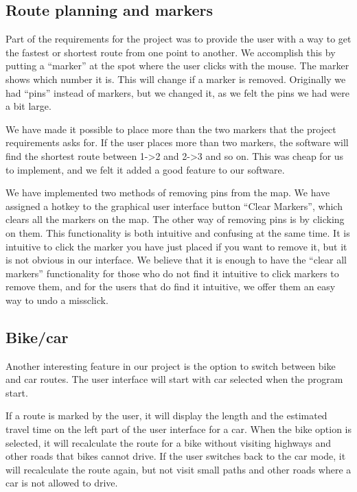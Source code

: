 \subsection{Route planning and markers}
\label{UIA-IF-M}
Part of the requirements for the project was to provide the user with a way to
get the fastest or shortest route from one point to another. We accomplish this
by putting a ``marker'' at the spot where the user clicks with the mouse. The
marker shows which number it is. This will change if a marker is removed.
Originally we had ``pins'' instead of markers, but we changed it, as we felt the
pins we had were a bit large.

We have made it possible to place more than the two markers that the project
requirements asks for. If the user places more than two markers, the software
will find the shortest route between 1->2 and 2->3 and so on. This was cheap for
us to implement, and we felt it added a good feature to our software. 

We have implemented two methods of removing pins from the map. We have assigned
a hotkey to the graphical user interface button ``Clear Markers'', which clears
all the markers on the map. The other way of removing pins is by clicking on
them. This functionality is both intuitive and confusing at the same time. It is
intuitive to click the marker you have just placed if you want to remove it, but
it is not obvious in our interface. We believe that it is enough to have the
``clear all markers'' functionality for those who do not find it intuitive to
click markers to remove them, and for the users that do find it intuitive, we
offer them an easy way to undo a missclick.
\subsection{Bike/car}
\label{UIA-IF-BC}
Another interesting feature in our  project is the option
to switch between bike and car routes. The user interface will start with car
selected when the program start. 

If a route is marked by the user, it will display the length and the estimated
travel time on the left part of the user interface for a car. When the bike
option is selected, it will recalculate the route for a bike without visiting
highways and other roads that bikes cannot drive. If the user switches back to
the car mode, it will recalculate the route again, but not visit small paths and
other roads where a car is not allowed to drive.

